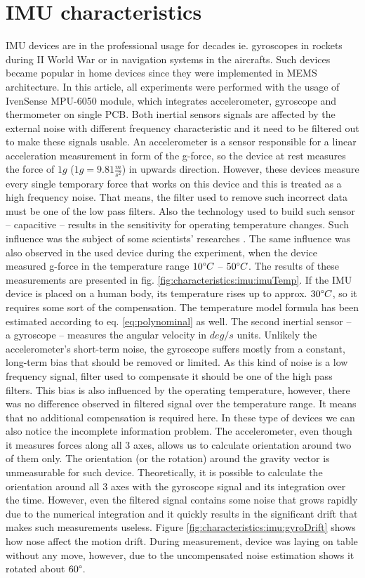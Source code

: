 \documentclass{llncs}
\begin{document}
\section{IMU characteristics}
IMU devices are in the professional usage for decades ie. gyroscopes in rockets during II World War or in navigation systems in the aircrafts. Such devices became popular in home devices since they were implemented in MEMS architecture. In this article, all experiments were performed with the usage of IvenSense MPU-6050 module, which integrates accelerometer, gyroscope and thermometer on single PCB. Both inertial sensors signals are affected by the external noise with different frequency characteristic and it need to be filtered out to make these signals usable.
An accelerometer is a sensor responsible for a linear acceleration measurement in form of the g-force, so the device at  rest measures the force of $1g$ ($1g = 9.81\frac{m}{s^2}$) in upwards direction. However, these devices measure every single temporary force that works on this device and this is treated as a high frequency noise. That means, the filter used to remove such incorrect data must be one of the low pass filters. Also the technology used to build such sensor -- capacitive -- results in the sensitivity for operating temperature changes. Such influence was the subject of some scientists' researches \cite{Gebhardt2006,Grigorie1996}. The same influence was also observed in the used device during the experiment, when the device measured g-force in the temperature range $10\degree C$ -- $50\degree C$. The results of  these measurements are presented in fig. \ref{fig:characteristics:imu:imuTemp}. If the IMU device is placed on a human body, its temperature rises up to approx. $30\degree C$, so it requires some sort of the compensation. The temperature model formula has been estimated according to eq. \eqref{eq:polynominal} as well.
The second inertial sensor -- a gyroscope -- measures the angular velocity in $deg/s$ units. Unlikely the accelerometer's short-term noise, the gyroscope suffers mostly from a constant, long-term bias that should be removed or limited. As this kind of noise is a low frequency signal, filter used to compensate it should be one of the high pass filters. This bias is also influenced by the operating temperature, however, there was no difference observed in filtered signal over the temperature range. It means that no additional compensation is required here. 
In these type of devices we can also notice the incomplete information problem. The accelerometer, even though it measures forces along all 3 axes, allows us to calculate orientation around two of them only. The orientation (or the rotation) around the gravity vector is unmeasurable for such device. Theoretically, it is possible to calculate the orientation around all 3 axes with the gyroscope signal and its integration over the time. However, even the filtered signal contains some noise that grows rapidly due to the numerical integration and it quickly results in the significant drift that makes such measurements useless. Figure \ref{fig:characteristics:imu:gyroDrift} shows how nose affect the motion drift. During measurement, device was laying on table without any move, however, due to the uncompensated noise estimation shows it rotated about $60\degree$.
\end{document}
